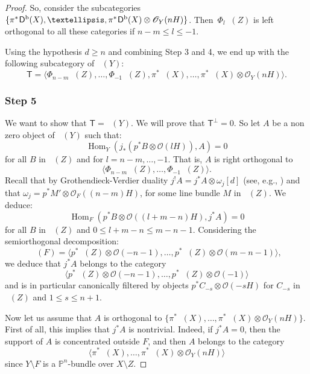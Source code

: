 \documentclass[11pt]{article}
\let\mathcal\mathscr
\theoremstyle{plain}
\theoremstyle{definition}
\newcommand{\cat}[1]{\mathsf{#1}}
\newcommand{\sod}[1]{\langle #1 \rangle}
\DeclareMathOperator{\Db}{{\cat{D}^{\mathrm{b}}}}
\DeclareMathOperator{\Hom}{Hom}
\newcommand{\PP}{\mathbb{P}}
\newcommand{\sheaf}[1]{\mathcal{#1}}
\newcommand{\ko}{\sheaf{O}}\let\OO\ko\let\cO\ko
\begin{document}
\begin{proof}
So, consider the subcategories $\{ \pi^*\mkern-2mu \Db(X),\ldots, \pi^* \mkern-2mu\Db(X)\otimes \ko_Y(nH)\}$. Then~$\Phi_l \Db(Z)$ is left orthogonal to all these categories if
$n-m \leq l \leq -1$.

Using the hypothesis $d \geq n$ and combining Step 3 and 4,
we end up with the following subcategory of $\Db(Y)$:
\[
\cat{T}=\sod{\Phi_{n-m}\Db(Z),\ldots,\Phi_{-1}\Db(Z),\pi^*\Db(X),\ldots,\pi^*\Db(X)\otimes \ko_Y(nH)}.
\]

\subsubsection*{Step 5}
We want to show that $\cat{T}=\Db(Y)$. We will prove that $\cat{T}^\perp=0$. So let $A$ be a non zero object of $\Db(Y)$ such that:\vspace*{-3pt}
\begin{equation*}\label{eq:orthogonal-to-PHIl}
\Hom_Y(j_*(p^* B \otimes \ko(lH)),A)=0
\end{equation*}
for all $B$ in $\Db(Z)$ and for $l=n-m,\ldots,-1$. That is, $A$ is right orthogonal to\vspace*{-3pt}
\[
\sod{\Phi_{n-m}\Db(Z),\ldots,\Phi_{-1}\Db(Z)}.
\]
Recall that by Grothendieck-Verdier duality $j^!A=j^*A \otimes \omega_j [d]$ (see, e.g., \cite[Cor.\,3.38]{Huybook}) and that
$\omega_j = p^*M' \otimes \ko_F((n-m)H)$, for some
line bundle $M$ in $\Db(Z)$.
We deduce:\vspace*{-3pt}
\[
\Hom_F(p^*B \otimes \ko((l+m-n)H),j^*A)= 0
\]
for all $B$ in $\Db(Z)$ and $0 \leq l+m-n \leq m-n-1$. Considering the semiorthogonal decomposition:\vspace*{-3pt}
\[
\Db(F) =\sod{p^*\Db(Z)\otimes \ko(-n-1),\ldots,p^*\Db(Z)\otimes \ko(m-n-1)},
\]
we deduce that $j^*A$ belongs to the category\vspace*{-3pt}
\[
\sod{p^*\Db(Z)\otimes \ko(-n-1),\ldots,p^*\Db(Z)\otimes \ko(-1)}
\]
and is in particular canonically filtered by objects $p^*C_{-s} \otimes \ko(-sH)$ for
$C_{-s}$ in $\Db(Z)$ and $1 \leq s \leq n+1$.

Now let us assume that $A$ is orthogonal to $\{\pi^*\Db(X),\ldots,\pi^*\Db(X)\otimes \ko_Y(nH)\}$.
First of all, this implies that $j^*A$ is nontrivial. Indeed, if $j^*A = 0$, then the support of $A$
is concentrated outside $F$, and then $A$ belongs to
the category\vspace*{-3pt}
\[
\sod{\pi^*\Db(X),\ldots,\pi^*\Db(X)\otimes \ko_Y(nH)}
\]
since $Y \setminus F$ is a $\PP^n$-bundle over $X \setminus Z$.


\end{proof}
\end{document}
